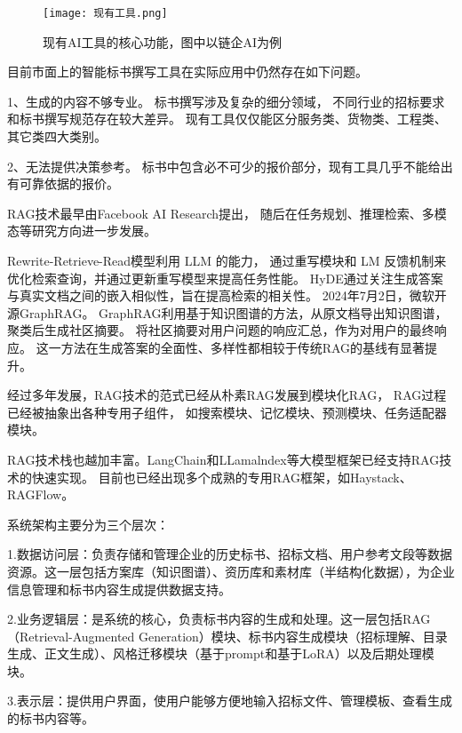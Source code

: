 \documentclass{xmu}
\begin{document}
\begin{figure}[!htb]
    \centering
    \texttt{[image: 现有工具.png]}\\
    \caption{现有AI工具的核心功能，图中以链企AI为例}\label{xmulogo}
\end{figure}

目前市面上的智能标书撰写工具在实际应用中仍然存在如下问题。

1、生成的内容不够专业。
标书撰写涉及复杂的细分领域，
不同行业的招标要求和标书撰写规范存在较大差异。
现有工具仅仅能区分服务类、货物类、工程类、其它类四大类别。

2、无法提供决策参考。
标书中包含必不可少的报价部分，现有工具几乎不能给出有可靠依据的报价。

RAG技术最早由Facebook AI Research提出，
随后在任务规划、推理检索、多模态等研究方向进一步发展。

Rewrite-Retrieve-Read模型利用 LLM 的能力，
通过重写模块和 LM 反馈机制来优化检索查询，并通过更新重写模型来提高任务性能\cite{RRR}。
HyDE通过关注生成答案与真实文档之间的嵌入相似性，旨在提高检索的相关性\cite{HyDE}。
2024年7月2日，微软开源GraphRAG\cite{graphRAG}。
GraphRAG利用基于知识图谱的方法，从原文档导出知识图谱，聚类后生成社区摘要。
将社区摘要对用户问题的响应汇总，作为对用户的最终响应。
这一方法在生成答案的全面性、多样性都相较于传统RAG的基线有显著提升。

经过多年发展，RAG技术的范式已经从朴素RAG发展到模块化RAG，
RAG过程已经被抽象出各种专用子组件，
如搜索模块、记忆模块、预测模块、任务适配器模块。\cite{RAG}

RAG技术栈也越加丰富。LangChain和LLamalndex等大模型框架已经支持RAG技术的快速实现。
目前也已经出现多个成熟的专用RAG框架，如Haystack、RAGFlow。


系统架构主要分为三个层次：

1.数据访问层：负责存储和管理企业的历史标书、招标文档、用户参考文段等数据资源。这一层包括方案库（知识图谱）、资历库和素材库（半结构化数据），为企业信息管理和标书内容生成提供数据支持。

2.业务逻辑层：是系统的核心，负责标书内容的生成和处理。这一层包括RAG（Retrieval-Augmented Generation）模块、标书内容生成模块（招标理解、目录生成、正文生成）、风格迁移模块（基于prompt和基于LoRA）以及后期处理模块。

3.表示层：提供用户界面，使用户能够方便地输入招标文件、管理模板、查看生成的标书内容等。
\end{document}
